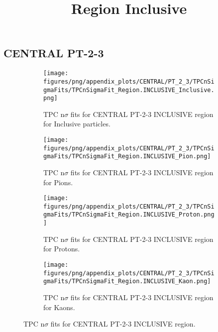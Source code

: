             \subsection{CENTRAL PT-2-3}
            \begin{figure}[H]
                \title{Region Inclusive}
                \begin{subfigure}[b]{0.5\textwidth}
                    \centering
                    \texttt{[image: figures/png/appendix\_plots/CENTRAL/PT\_2\_3/TPCnSigmaFits/TPCnSigmaFit\_Region.INCLUSIVE\_Inclusive.png]}
                    \caption{TPC n$\sigma$ fits for CENTRAL PT-2-3 INCLUSIVE region for Inclusive particles.}
                    \label{fig:appendix_CENTRAL_PT-2-3_INCLUSIVE_Inclusive}
                \end{subfigure}
                \begin{subfigure}[b]{0.5\textwidth}
                    \centering
                    \texttt{[image: figures/png/appendix\_plots/CENTRAL/PT\_2\_3/TPCnSigmaFits/TPCnSigmaFit\_Region.INCLUSIVE\_Pion.png]}
                    \caption{TPC n$\sigma$ fits for CENTRAL PT-2-3 INCLUSIVE region for Pions.}
                    \label{fig:appendix_CENTRAL_PT-2-3_INCLUSIVE_Pion}
                \end{subfigure}
                \begin{subfigure}[b]{0.5\textwidth}
                    \centering
                    \texttt{[image: figures/png/appendix\_plots/CENTRAL/PT\_2\_3/TPCnSigmaFits/TPCnSigmaFit\_Region.INCLUSIVE\_Proton.png]}
                    \caption{TPC n$\sigma$ fits for CENTRAL PT-2-3 INCLUSIVE region for Protons.}
                    \label{fig:appendix_CENTRAL_PT-2-3_INCLUSIVE_Proton}
                \end{subfigure}
                \begin{subfigure}[b]{0.5\textwidth}
                    \centering
                    \texttt{[image: figures/png/appendix\_plots/CENTRAL/PT\_2\_3/TPCnSigmaFits/TPCnSigmaFit\_Region.INCLUSIVE\_Kaon.png]}
                    \caption{TPC n$\sigma$ fits for CENTRAL PT-2-3 INCLUSIVE region for Kaons.}
                    \label{fig:appendix_CENTRAL_PT-2-3_INCLUSIVE_Kaon}
                \end{subfigure}
                \caption{TPC n$\sigma$ fits for CENTRAL PT-2-3 INCLUSIVE region.}
                \label{fig:appendix_CENTRAL_PT-2-3_INCLUSIVE}
            \end{figure}
